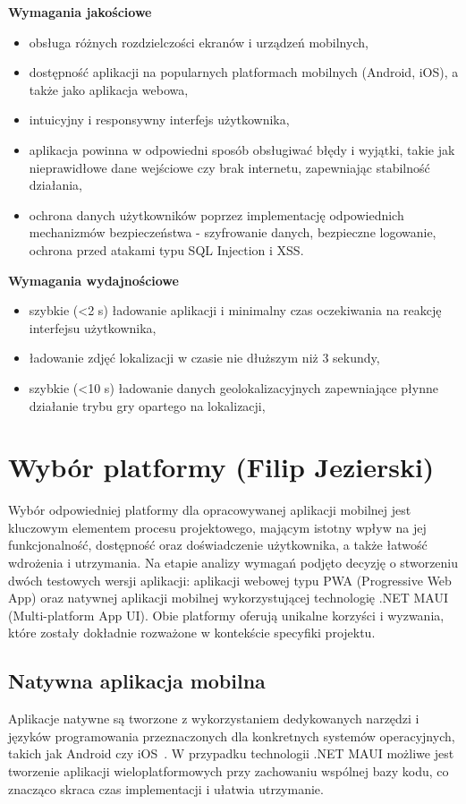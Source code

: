 \bigskip
\noindent
\textbf{Wymagania jakościowe}
\begin{itemize}
    \item obsługa różnych rozdzielczości ekranów i urządzeń mobilnych,
    \item dostępność aplikacji na popularnych platformach mobilnych (Android, iOS), a także jako aplikacja webowa,
    \item intuicyjny i responsywny interfejs użytkownika,
    \item aplikacja powinna w odpowiedni sposób obsługiwać błędy i wyjątki, takie jak nieprawidłowe dane wejściowe czy brak internetu, zapewniając stabilność działania,
    \item ochrona danych użytkowników poprzez implementację odpowiednich mechanizmów bezpieczeństwa - szyfrowanie danych, bezpieczne logowanie, ochrona przed atakami typu SQL Injection i XSS.
\end{itemize}

\bigskip
\noindent
\textbf{Wymagania wydajnościowe}
\begin{itemize}
    \item szybkie (<2 s) ładowanie aplikacji i minimalny czas oczekiwania na reakcję interfejsu użytkownika,
    \item ładowanie zdjęć lokalizacji w czasie nie dłuższym niż 3 sekundy,
    \item szybkie (<10 s) ładowanie danych geolokalizacyjnych zapewniające płynne działanie trybu gry opartego na lokalizacji,
\end{itemize}

\section{Wybór platformy (Filip Jezierski)}
Wybór odpowiedniej platformy dla opracowywanej aplikacji mobilnej jest kluczowym elementem procesu projektowego, mającym istotny wpływ na jej funkcjonalność, dostępność oraz doświadczenie użytkownika, a także łatwość wdrożenia i utrzymania. Na etapie analizy wymagań podjęto decyzję o stworzeniu dwóch testowych wersji aplikacji: aplikacji webowej typu PWA (Progressive Web App) oraz natywnej aplikacji mobilnej wykorzystującej technologię .NET MAUI (Multi-platform App UI). Obie platformy oferują unikalne korzyści i wyzwania, które zostały dokładnie rozważone w kontekście specyfiki projektu.

\subsection{Natywna aplikacja mobilna}
Aplikacje natywne są tworzone z wykorzystaniem dedykowanych narzędzi i języków programowania przeznaczonych dla konkretnych systemów operacyjnych, takich jak Android czy iOS~\cite{dotnet-maui-docs}. W przypadku technologii .NET MAUI możliwe jest tworzenie aplikacji wieloplatformowych przy zachowaniu wspólnej bazy kodu, co znacząco skraca czas implementacji i ułatwia utrzymanie.

